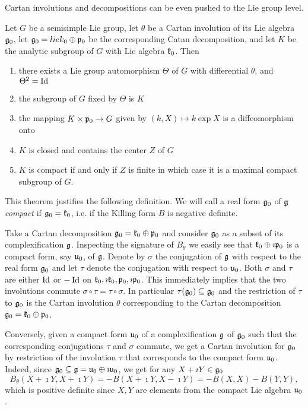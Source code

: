 Cartan involutions and decompositions can be even pushed to the Lie group level.
\begin{theorem}
 Let $G$ be a semisimple Lie group, let $\theta$ be a Cartan involution of its Lie algebra $\mathfrak{g}_0$, let $\mathfrak{g}_0 = lie{k}_0 \oplus \mathfrak{p}_0$ be the corresponding Catan decomposition, and let $K$ be the analytic subgroup of $G$ with Lie algebra $\mathfrak{k}_0$. Then
 \begin{enumerate}
  \item there exists a Lie group automorphism $\Theta$ of $G$ with differential $\theta$, and $\Theta^2=\operatorname{\mathrm{Id}}$
  \item the subgroup of $G$ fixed by $\Theta$ is $K$
  \item the mapping $K\times \mathfrak{p}_0 \to G$ given by $(k,X)\mapsto k \exp{X}$ is a diffeomorphism onto
  \item $K$ is closed and contains the center $Z$ of $G$
  \item $K$ is compact if and only if $Z$ is finite in which case it is a maximal compact subgroup of $G$.
 \end{enumerate}
\end{theorem}

This theorem justifies the following definition. We will call a real form $\mathfrak{g}_0$ of $\mathfrak{g}$ \emph{compact} if $\mathfrak{g}_0 = \mathfrak{k}_0$, i.e. if the Killing form $B$ is negative definite.

Take a Cartan decomposition $\mathfrak{g}_0 = \mathfrak{k}_0 \oplus \mathfrak{p}_0$ and consider $\mathfrak{g}_0$ as a subset of its complexification $\mathfrak{g}$. Inspecting the signature of $B_\theta$ we easily see that $\mathfrak{k}_0\oplus \imath \mathfrak{p}_0$ is a compact form, say $\mathfrak{u}_0$, of $\mathfrak{g}$. Denote by $\sigma$ the conjugation of $\mathfrak{g}$ with respect to the real form $\mathfrak{g}_0$ and let $\tau$ denote the conjugation with respect to $\mathfrak{u}_0$. Both $\sigma$ and $\tau$ are either $\operatorname{\mathrm{Id}}$ or $-\operatorname{\mathrm{Id}}$ on $\mathfrak{k}_0, \imath \mathfrak{k}_0, \mathfrak{p}_0, \imath \mathfrak{p}_0$. This immediately implies that the two involutions commute $\sigma \circ \tau = \tau \circ \sigma$. In particular $\tau (\mathfrak{g}_0) \subseteq \mathfrak{g}_0$ and the restriction of $\tau$ to $\mathfrak{g}_0$ is the Cartan involution $\theta$ corresponding to the Cartan decomposition $\mathfrak{g}_0=\mathfrak{k}_0 \oplus \mathfrak{p}_0$.

Conversely, given a compact form $\mathfrak{u}_0$ of a complexification $\mathfrak{g}$ of $\mathfrak{g}_0$ such that the corresponding conjugations $\tau$ and $\sigma$ commute, we get a Cartan involution for $\mathfrak{g}_0$ by restriction of the involution $\tau$ that corresponds to the compact form $\mathfrak{u}_0$. Indeed, since $\mathfrak{g}_0 \subseteq \mathfrak{g} = \mathfrak{u}_0 \oplus \imath \mathfrak{u}_0$, we get for any $X+\imath Y\in\mathfrak{g}_0$
\[
 B_\theta (X+\imath Y,X+\imath Y) = -B(X+\imath Y,X-\imath Y) = -B(X,X) - B(Y,Y),
\]
which is positive definite since $X,Y$ are elements from the compact Lie algebra $\mathfrak{u}_0$.

